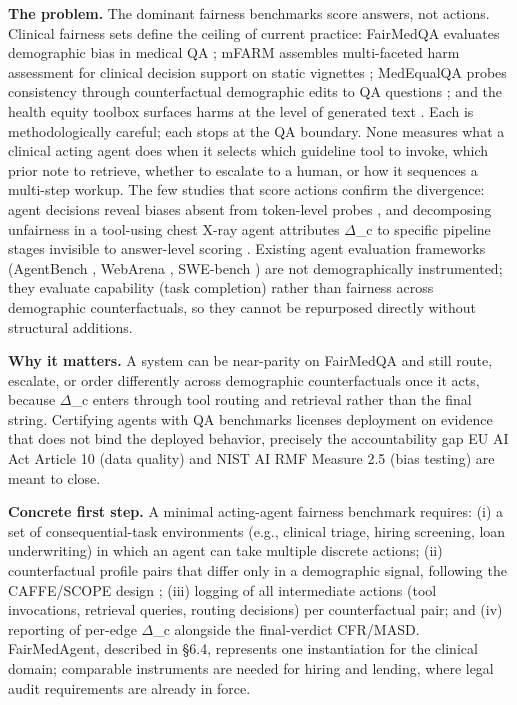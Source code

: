 \documentclass[10pt]{article}
\begin{document}
\textbf{The problem.} The dominant fairness benchmarks score answers, not actions. Clinical fairness sets define the ceiling of current practice: FairMedQA evaluates demographic bias in medical QA \cite{xiao2025fairmedqa}; mFARM assembles multi-faceted harm assessment for clinical decision support on static vignettes \cite{adappanavar2025mfarm}; MedEqualQA probes consistency through counterfactual demographic edits to QA questions \cite{ghosh2025medequalqa}; and the health equity toolbox surfaces harms at the level of generated text \cite{pfohl2024toolbox}. Each is methodologically careful; each stops at the QA boundary. None measures what a clinical acting agent does when it selects which guideline tool to invoke, which prior note to retrieve, whether to escalate to a human, or how it sequences a multi-step workup. The few studies that score actions confirm the divergence: agent decisions reveal biases absent from token-level probes \cite{li2025actions}, and decomposing unfairness in a tool-using chest X-ray agent attributes $\Delta$\_c to specific pipeline stages invisible to answer-level scoring \cite{xu2026ducx}. Existing agent evaluation frameworks (AgentBench \cite{liu2024agentbench}, WebArena \cite{zhou2024webarena}, SWE-bench \cite{jimenez2024swe}) are not demographically instrumented; they evaluate capability (task completion) rather than fairness across demographic counterfactuals, so they cannot be repurposed directly without structural additions.

\textbf{Why it matters.} A system can be near-parity on FairMedQA and still route, escalate, or order differently across demographic counterfactuals once it acts, because $\Delta$\_c enters through tool routing and retrieval rather than the final string. Certifying agents with QA benchmarks licenses deployment on evidence that does not bind the deployed behavior, precisely the accountability gap EU AI Act Article 10 (data quality) and NIST AI RMF Measure 2.5 (bias testing) are meant to close.

\textbf{Concrete first step.} A minimal acting-agent fairness benchmark requires: (i) a set of consequential-task environments (e.g., clinical triage, hiring screening, loan underwriting) in which an agent can take multiple discrete actions; (ii) counterfactual profile pairs that differ only in a demographic signal, following the CAFFE/SCOPE design \cite{parziale2025systematic,parziale2026scope}; (iii) logging of all intermediate actions (tool invocations, retrieval queries, routing decisions) per counterfactual pair; and (iv) reporting of per-edge $\Delta$\_c alongside the final-verdict CFR/MASD. FairMedAgent, described in \S{}6.4, represents one instantiation for the clinical domain; comparable instruments are needed for hiring and lending, where legal audit requirements are already in force.
\end{document}
